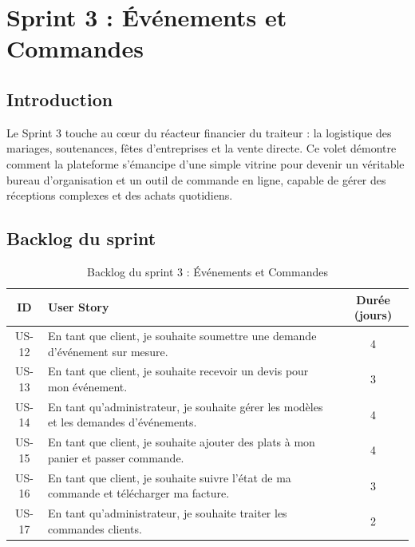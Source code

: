 ﻿%
\chapter{Sprint 3 : Événements et Commandes}

\section{Introduction}

Le Sprint 3 touche au cœur du réacteur financier du traiteur : la logistique des mariages, soutenances, fêtes d'entreprises et la vente directe. Ce volet démontre comment la plateforme s'émancipe d'une simple vitrine pour devenir un véritable bureau d'organisation et un outil de commande en ligne, capable de gérer des réceptions complexes et des achats quotidiens.

\section{Backlog du sprint}

\begin{table}[H]
    \centering
    \caption{Backlog du sprint 3 : Événements et Commandes}
    \label{tab:backlog_sprint3}
    \renewcommand{\arraystretch}{1.3}
    \begin{tabular}{|c|p{8cm}|c|}
        \hline
        \textbf{ID} & \textbf{User Story} & \textbf{Durée (jours)} \\
        \hline
        US-12 & En tant que client, je souhaite soumettre une demande d'événement sur mesure. & 4 \\
        \hline
        US-13 & En tant que client, je souhaite recevoir un devis pour mon événement. & 3 \\
        \hline
        US-14 & En tant qu'administrateur, je souhaite gérer les modèles et les demandes d'événements. & 4 \\
        \hline
        US-15 & En tant que client, je souhaite ajouter des plats à mon panier et passer commande. & 4 \\
        \hline
        US-16 & En tant que client, je souhaite suivre l'état de ma commande et télécharger ma facture. & 3 \\
        \hline
        US-17 & En tant qu'administrateur, je souhaite traiter les commandes clients. & 2 \\
        \hline
    \end{tabular}
\end{table}

